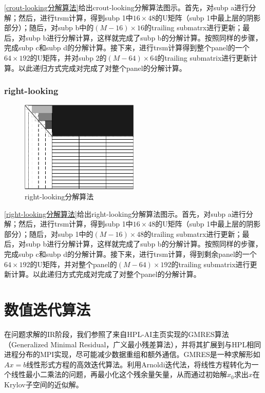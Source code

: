     \autoref{crout-looking分解算法}给出crout-looking分解算法图示。首先，对subp a进行分解；然后，进行trsm计算，得到subp 1中$16\times48$的U矩阵（subp 1中最上层的阴影部分）；随后，对subp b中的$(M-16)\times16$的trailing submatrx进行更新；最后，对subp b进行分解计算，这样就完成了subp b的分解计算。按照同样的步骤，完成subp c和subp d的分解计算。接下来，进行trsm计算得到整个panel的一个$64\times192$的U矩阵，并对subp 2的$(M-64)\times64$的trailing submatrix进行更新计算。以此递归方式完成对完成了对整个panel的分解计算。

    \subsubsection{right-looking}

    \begin{figure}
        \centering
        \includegraphics[width=0.5\textwidth]{image/chap02/right-looking}
        \caption{right-looking分解算法}
        \label{right-looking分解算法}
    \end{figure}

    \autoref{right-looking分解算法}给出right-looking分解算法图示。首先，对subp a进行分解；然后，进行trsm计算，得到subp 1中$16\times48$的U矩阵（subp 1中最上层的阴影部分）；随后，对subp 1中的$(M-16)\times48$的trailing submatrx进行更新；最后，对subp b进行分解计算，这样就完成了subp b的分解计算。按照同样的步骤，完成subp c和subp d的分解计算。接下来，进行trsm计算，得到剩余panel的一个$64\times192$的U矩阵，并对整个panel的$(M-64)×192$的trailing submatrix进行更新计算。以此递归方式完成对完成了对整个panel的分解计算。

    \section{数值迭代算法}

    在问题求解的IR阶段，我们参照了来自HPL-AI主页实现的GMRES算法（Generalized Minimal Residual，广义最小残差算法）\cite{1986GMRES}，并将其扩展到与HPL相同进程分布的MPI实现，尽可能减少数据重组和额外通信。GMRES是一种求解形如$Ax=b$线性形式方程的高效迭代算法。利用Arnoldi迭代法，将线性方程转化为一个线性最小二乘法的问题，再最小化这个残余量矢量，从而通过初始解$x_0$求出$x$在Krylov子空间的近似解。

